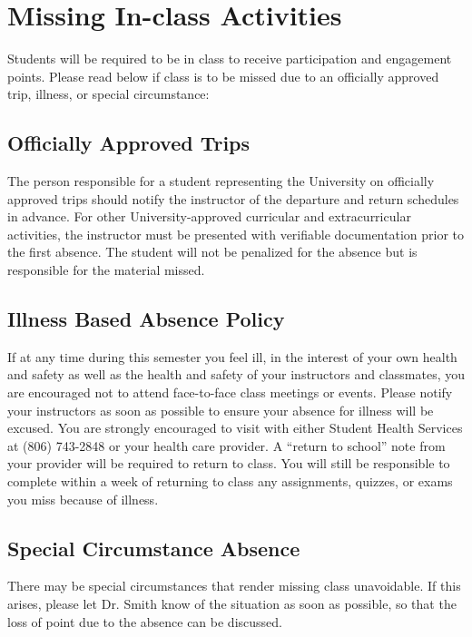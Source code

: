 \documentclass[12pt, notitlepage]{article}   	%
\begin{document}
{\section{Missing In-class Activities}
Students will be required to be in class to receive participation and engagement points. 
Please read below if class is to be missed due to an officially approved trip, illness, or special circumstance:

\subsection{Officially Approved Trips}
The person responsible for a student representing the University on officially 
approved trips should notify the instructor of the departure and return schedules in advance. 
For other University-approved curricular and extracurricular activities, 
the instructor must be presented with verifiable documentation prior to the first absence. 
The student will not be penalized for the absence but is responsible for the material missed.

\subsection{Illness Based Absence Policy}
If at any time during this semester you feel ill, in the interest of your own 
health and safety as well as the health and safety of your instructors and classmates, 
you are encouraged not to attend face-to-face class meetings or events. 
Please notify your instructors as soon as possible to ensure your absence for 
illness will be excused. 
You are strongly encouraged to visit with either Student Health Services at (806) 743-2848 
or your health care provider. 
A “return to school” note from your provider will be required to return to class. 
You will still be responsible to complete within a week of returning to class any 
assignments, quizzes, or exams you miss because of illness.

\subsection{Special Circumstance Absence}
There may be special circumstances that render missing class unavoidable.
If this arises, please let Dr. Smith know of the situation as soon as possible,
so that the loss of point due to the absence can be discussed.

}
\end{document}
